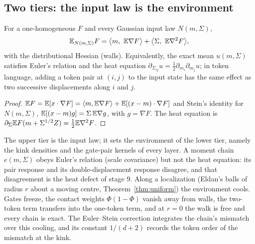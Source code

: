 \subsection{Two tiers: the input law is the environment}
\begin{theorem}\label{thm:tiers}
For a one-homogeneous $F$ and every Gaussian input law $N(m,\Sigma)$,
\[
\mathbb E_{N(m,\Sigma)}F=\big\langle m,\ \mathbb E\nabla F\big\rangle+\big\langle\Sigma,\ \mathbb E\nabla^2F\big\rangle ,
\]
with the distributional Hessian (walls). Equivalently, the exact mean $u(m,\Sigma)$ satisfies Euler's relation and the heat
equation $\partial_{\Sigma_{ij}}u=\tfrac12\partial_{m_i}\partial_{m_j}u$; in token language, adding a token pair at $(i,j)$ to the input
state has the same effect as two successive displacements along $i$ and $j$.
\end{theorem}
\begin{proof}
$\mathbb E F=\mathbb E[x\cdot\nabla F]=\langle m,\mathbb E\nabla F\rangle+\mathbb E[(x-m)\cdot\nabla F]$ and Stein's identity for $N(m,\Sigma)$,
$\mathbb E[(x-m)g]=\Sigma\,\mathbb E\nabla g$, with $g=\nabla F$. The heat equation is $\partial_\Sigma\mathbb E F(m+\Sigma^{1/2}Z)=\tfrac12\mathbb E\nabla^2F$.
\end{proof}

The upper tier is the input law; it sets the environment of the lower tier, namely the kink densities and the
gate-pair kernels of every layer. A moment chain $e(m,\Sigma)$ obeys Euler's relation (scale covariance) but not the heat
equation: its pair response and its double-displacement response disagree, and that disagreement is the heat defect of
stage 9. Along a localization (Eldan's balls of radius $r$ about a moving centre, Theorem~\ref{thm:uniform}) the environment
cools. Gates freeze, the contact weights $\Phi(1-\Phi)$ vanish away from walls, the two-token term transfers into the
one-token term, and at $r=0$ the walk is free and every chain is exact. The Euler--Stein correction integrates the
chain's mismatch over this cooling, and its constant $1/(d+2)$ records the token order of the mismatch at the kink.


